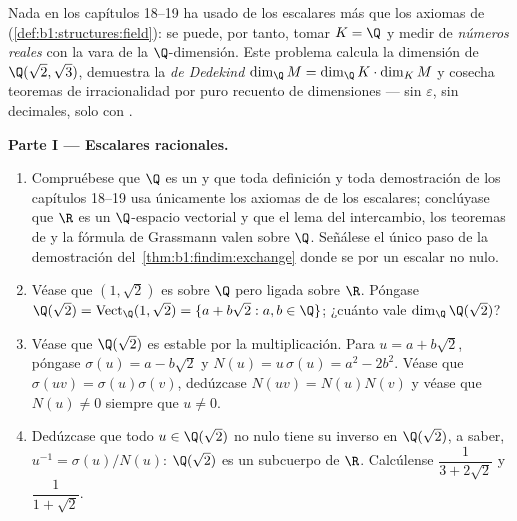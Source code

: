 \begin{problem}\label{pb:b1:findim:1}
Nada en los capítulos 18--19 ha usado de los escalares más que los
axiomas de  (\cref{def:b1:structures:field}): se puede, por tanto,
tomar $K = \Q$ y medir  de \emph{números reales} con la vara
de la $\Q$-dimensión. Este problema calcula la dimensión de
$\Q(\sqrt2, \sqrt3)$, demuestra la \emph{ de
Dedekind} $\dim_\Q M = \dim_\Q K \cdot \dim_K M$ y cosecha teoremas
de irracionalidad por puro recuento de dimensiones --- sin
$\varepsilon$, sin decimales, solo con .

\medskip
\noindent\textbf{Parte I --- Escalares racionales.}
\begin{enumerate}
  \item Compruébese que $\Q$ es un  y que toda definición y
        toda demostración de los capítulos 18--19 usa únicamente los
        axiomas de  de los escalares; conclúyase que $\R$ es
        un $\Q$-espacio vectorial y que el lema del intercambio, los
        teoremas de  y la fórmula de Grassmann valen sobre
        $\Q$. Señálese el único paso de la demostración
        del~\cref{thm:b1:findim:exchange} donde se  por un
        escalar no nulo.
  \item Véase que $(1, \sqrt2)$ es  sobre $\Q$ pero ligada
        sobre $\R$. Póngase $\Q(\sqrt2) = \operatorname{Vect}_\Q(1,
        \sqrt2) = \{a + b\sqrt2 : a, b \in \Q\}$; ¿cuánto vale
        $\dim_\Q \Q(\sqrt2)$?
  \item Véase que $\Q(\sqrt2)$ es estable por la multiplicación.
        Para $u = a + b\sqrt2$, póngase $\sigma(u) = a - b\sqrt2$ y
        $N(u) = u\,\sigma(u) = a^2 - 2b^2$. Véase que
        $\sigma(uv) = \sigma(u)\sigma(v)$, dedúzcase
        $N(uv) = N(u)N(v)$ y véase que $N(u) \neq 0$ siempre que
        $u \neq 0$.
  \item Dedúzcase que todo $u \in \Q(\sqrt2)$ no nulo tiene su
        inverso en $\Q(\sqrt2)$, a saber,
        $u^{-1} = \sigma(u)/N(u)$: $\Q(\sqrt2)$ es un subcuerpo de
        $\R$. Calcúlense $\dfrac1{3 + 2\sqrt2}$ y
        $\dfrac1{1 + \sqrt2}$.
\end{enumerate}


\end{problem}
